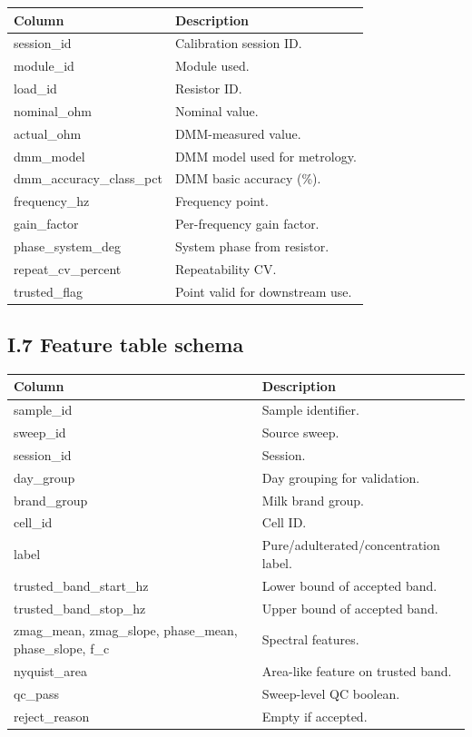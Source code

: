 \documentclass[11pt,a4paper]{article}
\begin{document}
\begin{xltabular}{\textwidth}{L{42mm}Y}
\toprule
\textbf{Column} & \textbf{Description}\\
\midrule
session\_id & Calibration session ID.\\
module\_id & Module used.\\
load\_id & Resistor ID.\\
nominal\_ohm & Nominal value.\\
actual\_ohm & DMM-measured value.\\
dmm\_model & DMM model used for metrology.\\
dmm\_accuracy\_class\_pct & DMM basic accuracy (\%).\\
frequency\_hz & Frequency point.\\
gain\_factor & Per-frequency gain factor.\\
phase\_system\_deg & System phase from resistor.\\
repeat\_cv\_percent & Repeatability CV.\\
trusted\_flag & Point valid for downstream use.\\
\bottomrule
\end{xltabular}

\subsection{I.7 Feature table schema}

\begin{xltabular}{\textwidth}{L{42mm}Y}
\toprule
\textbf{Column} & \textbf{Description}\\
\midrule
sample\_id & Sample identifier.\\
sweep\_id & Source sweep.\\
session\_id & Session.\\
day\_group & Day grouping for validation.\\
brand\_group & Milk brand group.\\
cell\_id & Cell ID.\\
label & Pure/adulterated/concentration label.\\
trusted\_band\_start\_hz & Lower bound of accepted band.\\
trusted\_band\_stop\_hz & Upper bound of accepted band.\\
zmag\_mean, zmag\_slope, phase\_mean, phase\_slope, f\_c & Spectral features.\\
nyquist\_area & Area-like feature on trusted band.\\
qc\_pass & Sweep-level QC boolean.\\
reject\_reason & Empty if accepted.\\
\bottomrule
\end{xltabular}
\end{document}
